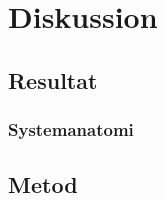 \chapter{Diskussion}
\label{cha:discussion}

\section{Resultat}
\label{sec:discussion-results}

\subsection{Systemanatomi}



\section{Metod}
\label{sec:discussion-method}





